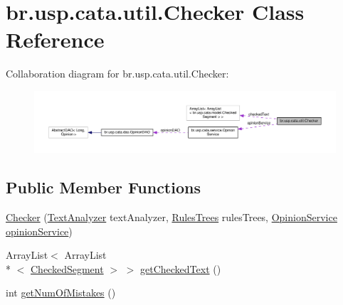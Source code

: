 \hypertarget{classbr_1_1usp_1_1cata_1_1util_1_1_checker}{\section{br.\+usp.\+cata.\+util.\+Checker Class Reference}
\label{classbr_1_1usp_1_1cata_1_1util_1_1_checker}
}


Collaboration diagram for br.\+usp.\+cata.\+util.\+Checker\+:\nopagebreak
\begin{figure}[H]
\begin{center}
\leavevmode
\includegraphics[width=350pt]{classbr_1_1usp_1_1cata_1_1util_1_1_checker__coll__graph}
\end{center}
\end{figure}
\subsection*{Public Member Functions}
\begin{DoxyCompactItemize}
\item 
\hyperlink{classbr_1_1usp_1_1cata_1_1util_1_1_checker_ae9812a1e6e521013d694d91f3ca1e4c8}{Checker} (\hyperlink{classbr_1_1usp_1_1cata_1_1util_1_1_text_analyzer}{Text\+Analyzer} text\+Analyzer, \hyperlink{classbr_1_1usp_1_1cata_1_1util_1_1_rules_trees}{Rules\+Trees} rules\+Trees, \hyperlink{classbr_1_1usp_1_1cata_1_1service_1_1_opinion_service}{Opinion\+Service} \hyperlink{classbr_1_1usp_1_1cata_1_1util_1_1_checker_a492169be77027a44a2658cc9ea46e1fc}{opinion\+Service})
\item 
Array\+List$<$ Array\+List\\*
$<$ \hyperlink{classbr_1_1usp_1_1cata_1_1model_1_1_checked_segment}{Checked\+Segment} $>$ $>$ \hyperlink{classbr_1_1usp_1_1cata_1_1util_1_1_checker_a24f1572ee2511f24f3e49c652089cf8f}{get\+Checked\+Text} ()
\item 
int \hyperlink{classbr_1_1usp_1_1cata_1_1util_1_1_checker_a7b89bba4d32932068b755f219d6954bd}{get\+Num\+Of\+Mistakes} ()
\end{DoxyCompactItemize}
